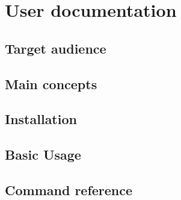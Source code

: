 
\chapter{User documentation}

\section{Target audience}

\section{Main concepts}

\section{Installation}

\section{Basic Usage}

\section{Command reference}


